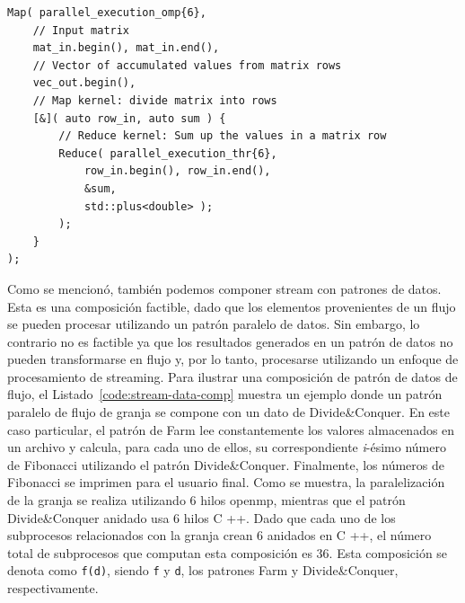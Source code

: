 \vspace{0.35cm}
\begin{lstlisting}[frame=single,label={code:data-data-comp},caption={Ejemplo de composición Map-Reduce.}]
Map( parallel_execution_omp{6},
    // Input matrix
    mat_in.begin(), mat_in.end(),
    // Vector of accumulated values from matrix rows
    vec_out.begin(),
    // Map kernel: divide matrix into rows
    [&]( auto row_in, auto sum ) {
        // Reduce kernel: Sum up the values in a matrix row
        Reduce( parallel_execution_thr{6},
            row_in.begin(), row_in.end(), 
            &sum, 
            std::plus<double> );
        );
    }
);
\end{lstlisting}
\vspace{0.35cm}

Como se mencionó, también podemos componer stream con patrones de datos. Esta es una composición factible, dado que los elementos provenientes de un flujo se pueden procesar utilizando un patrón paralelo de datos. Sin embargo, lo contrario no es factible ya que los resultados generados en un patrón de datos no pueden transformarse en flujo y, por lo tanto, procesarse utilizando un enfoque de procesamiento de streaming. Para ilustrar una composición de patrón de datos de flujo, el Listado~\ref{code:stream-data-comp} muestra un ejemplo donde un patrón paralelo de flujo de granja se compone con un dato de Divide\&Conquer. En este caso particular, el patrón de Farm lee constantemente los valores almacenados en un archivo y calcula, para cada uno de ellos, su correspondiente \emph{i}-ésimo número de Fibonacci utilizando el patrón Divide\&Conquer. Finalmente, los números de Fibonacci se imprimen para el usuario final. Como se muestra, la paralelización de la granja se realiza utilizando 6 hilos \acrshort{openmp}, mientras que el patrón Divide\&Conquer anidado usa 6 hilos C ++. Dado que cada uno de los subprocesos relacionados con la granja crean 6 anidados en C ++, el número total de subprocesos que computan esta composición es 36. Esta composición se denota como \texttt{f(d)}, siendo \texttt{f} y \texttt{d}, los patrones Farm y Divide\&Conquer, respectivamente.

